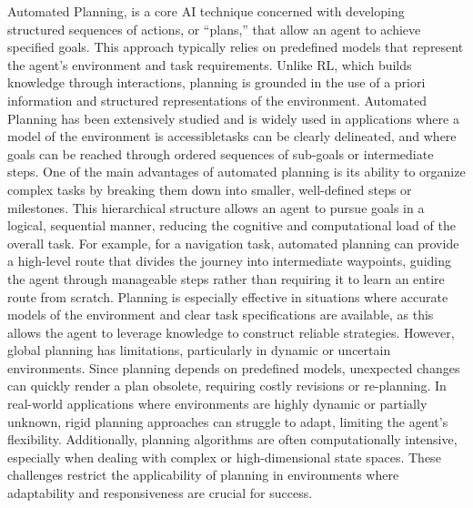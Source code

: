 Automated Planning, is a core AI technique concerned with developing structured sequences of actions, or “plans,” 
that allow an agent to achieve specified goals. 
This approach typically relies on predefined models that represent the agent’s environment and task requirements.
Unlike RL, which builds knowledge through interactions, planning is grounded in the use of a priori information and
structured representations of the environment.
Automated Planning has been extensively studied and is widely used in applications where a model of the environment is accessibletasks can be clearly delineated,
and where goals can be reached through ordered sequences of sub-goals or intermediate steps.
One of the main advantages of automated planning is its ability to organize complex tasks by breaking them down into
smaller, well-defined steps or milestones.
This hierarchical structure allows an agent to pursue goals in a logical, sequential manner, reducing the cognitive
and computational load of the overall task.
For example, for a navigation task, automated planning can provide a high-level route that divides the journey into intermediate
waypoints, guiding the agent through manageable steps rather than requiring it to learn an entire route from scratch.
Planning is especially effective in situations where accurate models of the environment and clear task specifications
are available, as this allows the agent to leverage knowledge to construct reliable strategies.
However, global planning has limitations, particularly in dynamic or uncertain environments.
Since planning depends on predefined models, unexpected changes can quickly render a plan obsolete, requiring costly
revisions or re-planning.
In real-world applications where environments are highly dynamic or partially unknown, rigid planning approaches can
struggle to adapt, limiting the agent’s flexibility.
Additionally, planning algorithms are often computationally intensive, especially when dealing with complex or
high-dimensional state spaces.
These challenges restrict the applicability of planning in environments where adaptability and responsiveness are
crucial for success.

